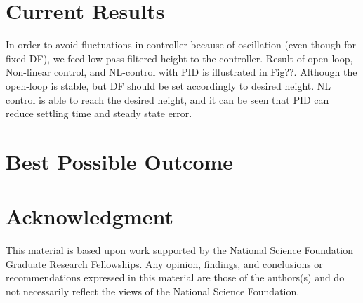 \documentclass[letterpaper,twocolumn]{article}
\begin{document}
\section*{Current Results}
In order to avoid fluctuations in controller because of oscillation (even though for fixed DF), we feed low-pass filtered height to the controller. Result of open-loop, Non-linear control, and NL-control with PID is illustrated in Fig??. Although the open-loop is stable, but DF should be set accordingly to desired height. NL control is able to reach the desired height, and it can be seen that PID can reduce settling time and steady state error. 

\section*{Best Possible Outcome}

\section*{Acknowledgment}
This material is based upon work supported by the National Science Foundation Graduate Research Fellowships. Any opinion, findings, and conclusions or recommendations expressed in this material are those of the authors(s) and do not necessarily reflect the views of the National Science Foundation.



\end{document}
